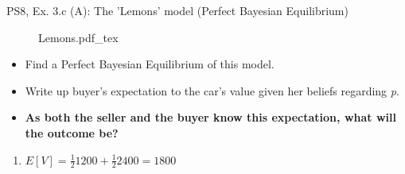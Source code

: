 \begin{frame}{PS8, Ex. 3.c (A): The 'Lemons' model (Perfect Bayesian Equilibrium)}
    \begin{figure}[!h]
      \center {}
      {Lemons.pdf_tex}
    \end{figure}
    \vspace{-8pt}
    \begin{itemize}
      \item[(c)] Find a Perfect Bayesian Equilibrium of this model.
    \end{itemize}
    \vspace{-8pt}
    \begin{multicols}{2}
      \begin{itemize}
        \item[Step 1:] Write up buyer's expectation to the car's value given her beliefs regarding \textit{p}.
        \item[Step 2:] \textbf{As both the seller and the buyer know this expectation, what will the outcome be?}
      \end{itemize}
      \vfill\null\columnbreak
      \begin{enumerate}
        \item $E[V]=\frac{1}{2}1200+\frac{1}{2}2400=1800$
      \end{enumerate}
      \vfill\null
    \end{multicols}
\end{frame}
